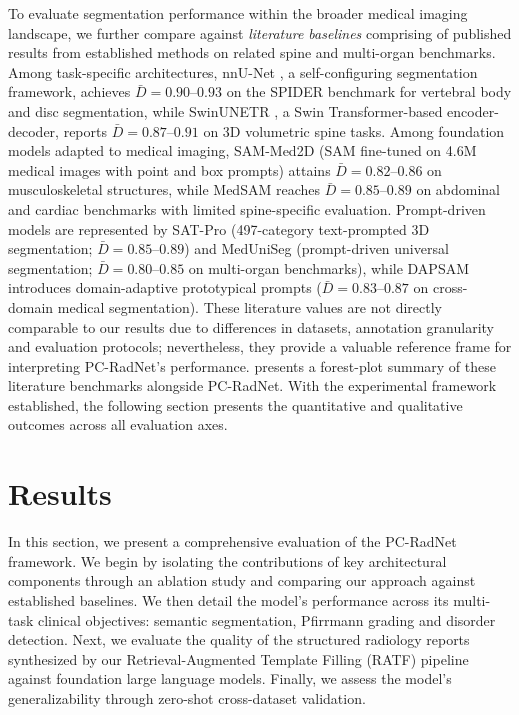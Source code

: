 \documentclass[journal]{IEEEtran}
\newcommand{\modelname}{PC-RadNet}
\begin{document}
To evaluate segmentation performance within the broader medical imaging landscape, we further compare against \emph{literature baselines} comprising of published results from established methods on related spine and multi-organ benchmarks. Among task-specific architectures, nnU-Net \cite{isensee2021nnu}, a self-configuring segmentation framework, achieves $\bar{D}=0.90$--$0.93$ on the SPIDER benchmark \cite{van2024spider} for vertebral body and disc segmentation, while SwinUNETR \cite{hatamizadeh2022swinunetr}, a Swin Transformer-based encoder-decoder, reports $\bar{D}=0.87$--$0.91$ on 3D volumetric spine tasks. Among foundation models adapted to medical imaging, SAM-Med2D \cite{cheng2023sammed2d} (SAM fine-tuned on 4.6M medical images with point and box prompts) attains $\bar{D}=0.82$--$0.86$ on musculoskeletal structures, while MedSAM \cite{ma2024medsam} reaches $\bar{D}=0.85$--$0.89$ on abdominal and cardiac benchmarks with limited spine-specific evaluation. Prompt-driven models are represented by SAT-Pro \cite{satpro2025} (497-category text-prompted 3D segmentation; $\bar{D}=0.85$--$0.89$) and MedUniSeg \cite{meduniseg_2024} (prompt-driven universal segmentation; $\bar{D}=0.80$--$0.85$ on multi-organ benchmarks), while DAPSAM \cite{dapsam_2025} introduces domain-adaptive prototypical prompts ($\bar{D}=0.83$--$0.87$ on cross-domain medical segmentation).
These literature values are not directly comparable to our results due to differences in datasets, annotation granularity and evaluation protocols; nevertheless, they provide a valuable reference frame for interpreting \modelname{}'s performance.  presents a forest-plot summary of these literature benchmarks alongside \modelname{}.
With the experimental framework established, the following section presents the quantitative and qualitative outcomes across all evaluation axes.

\section{Results}
\label{sec:results}
In this section, we present a comprehensive evaluation of the \modelname{} framework. We begin by isolating the contributions of key architectural components through an ablation study and comparing our approach against established baselines. We then detail the model's performance across its multi-task clinical objectives: semantic segmentation, Pfirrmann grading and disorder detection. Next, we evaluate the quality of the structured radiology reports synthesized by our Retrieval-Augmented Template Filling (RATF) pipeline against foundation large language models. Finally, we assess the model's generalizability through zero-shot cross-dataset validation.
\end{document}
